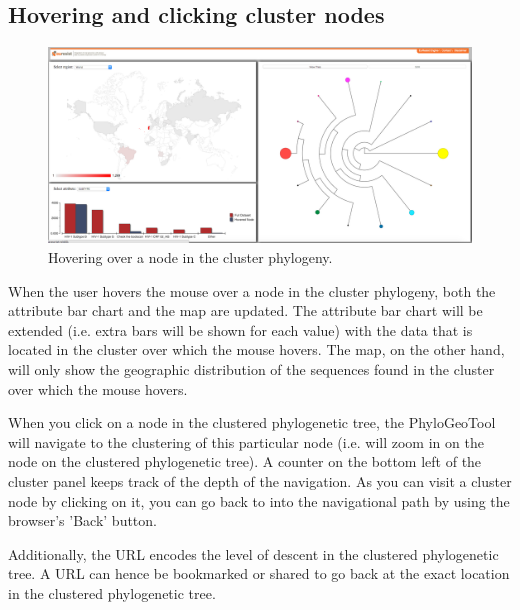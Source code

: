 \documentclass[a4paper, 11pt]{article} %
\begin{document}
\subsection{Hovering and clicking cluster nodes}
\begin{figure}[H]
\centering
\includegraphics[scale=0.1875]{images/hover_node.PNG}
\vspace{-0.75cm}
\caption{Hovering over a node in the cluster phylogeny.}
\label{fig:hovernode}
\end{figure}

When the user hovers the mouse over a node in the cluster phylogeny, both the attribute bar chart and the map are updated. 
The attribute bar chart will be extended (i.e. extra bars will be shown for each value) with the data that is located in the cluster over which the mouse hovers. %
The map, on the other hand, will only show the geographic distribution of the sequences found in the cluster over which the mouse hovers.

When you click on a node in the clustered phylogenetic tree, the PhyloGeoTool will navigate to the clustering of this particular node (i.e. will zoom in on the node on the clustered phylogenetic tree).
A counter on the bottom left of the cluster panel keeps track of the depth of the navigation. 
As you can visit a cluster node by clicking on it, you can go back to into the navigational path by using the browser's 'Back' button.

Additionally, the URL encodes the level of descent in the clustered phylogenetic tree. 
A URL can hence be bookmarked or shared to go back at the exact location in the clustered phylogenetic tree. 
\end{document}
